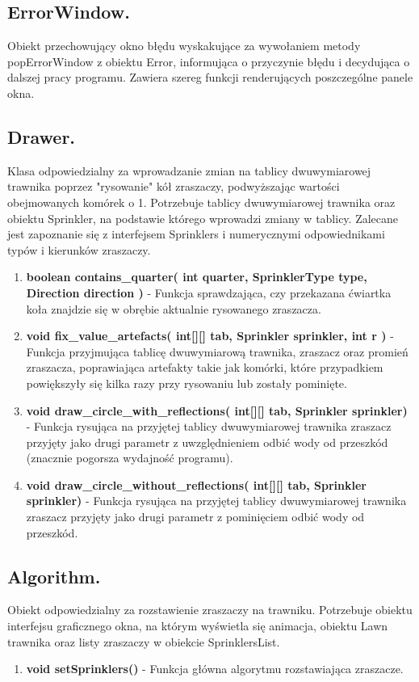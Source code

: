 \documentclass[a4paper]{article}
\begin{document}
\subsection{ErrorWindow.}
Obiekt przechowujący okno błędu wyskakujące za wywołaniem metody popErrorWindow z obiektu Error, informująca o przyczynie błędu i decydująca o dalszej pracy programu. Zawiera szereg funkcji renderujących poszczególne panele okna.

\subsection{Drawer.}
Klasa odpowiedzialny za wprowadzanie zmian na tablicy dwuwymiarowej trawnika poprzez "rysowanie" kół zraszaczy, podwyższając wartości obejmowanych komórek o 1. Potrzebuje tablicy dwuwymiarowej trawnika oraz obiektu Sprinkler, na podstawie którego wprowadzi zmiany w tablicy. Zalecane jest zapoznanie się z interfejsem Sprinklers i numerycznymi odpowiednikami typów i kierunków zraszaczy.
\begin{enumerate}
    	\item \textbf{boolean contains\_quarter( int quarter, SprinklerType type, Direction direction )} - Funkcja sprawdzająca, czy przekazana ćwiartka koła znajdzie się w obrębie aktualnie rysowanego zraszacza. 
    	\item \textbf{void fix\_value\_artefacts( int[][] tab, Sprinkler sprinkler, int r )} - Funkcja przyjmująca tablicę dwuwymiarową trawnika, zraszacz oraz promień zraszacza, poprawiająca artefakty takie jak komórki, które przypadkiem powiększyły się kilka razy przy rysowaniu lub zostały pominięte.
    	\item \textbf{void draw\_circle\_with\_reflections( int[][] tab, Sprinkler sprinkler)} - Funkcja rysująca na przyjętej tablicy dwuwymiarowej trawnika zraszacz przyjęty jako drugi parametr z uwzględnieniem odbić wody od przeszkód (znacznie pogorsza wydajność programu).
    	\item \textbf{void draw\_circle\_without\_reflections( int[][] tab, Sprinkler sprinkler)} - Funkcja rysująca na przyjętej tablicy dwuwymiarowej trawnika zraszacz przyjęty jako drugi parametr z pominięciem odbić wody od przeszkód.
\end{enumerate}

\subsection{Algorithm.}
Obiekt odpowiedzialny za rozstawienie zraszaczy na trawniku. Potrzebuje obiektu interfejsu graficznego okna, na którym wyświetla się animacja, obiektu Lawn trawnika oraz listy zraszaczy w obiekcie SprinklersList.
\begin{enumerate}
    	\item \textbf{void setSprinklers()} - Funkcja główna algorytmu rozstawiająca zraszacze.
\end{enumerate}
\end{document}
